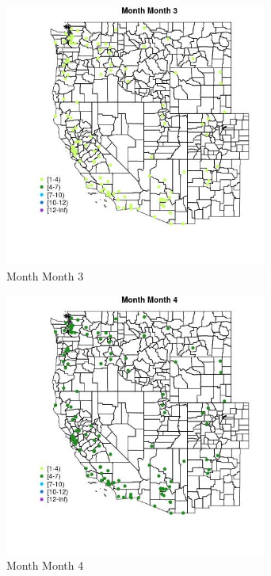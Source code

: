 \begin{figure} 
\centering  
\includegraphics[width=0.77\textwidth]{Code_Outputs/Report_ML_input_PM25_Step4_part_e_de_duplicated_aves_MapObsMo3Month.jpg} 
\caption{\label{fig:Report_ML_input_PM25_Step4_part_e_de_duplicated_avesMapObsMo3Month}Month Month 3} 
\end{figure} 
 

\begin{figure} 
\centering  
\includegraphics[width=0.77\textwidth]{Code_Outputs/Report_ML_input_PM25_Step4_part_e_de_duplicated_aves_MapObsMo4Month.jpg} 
\caption{\label{fig:Report_ML_input_PM25_Step4_part_e_de_duplicated_avesMapObsMo4Month}Month Month 4} 
\end{figure} 
 

